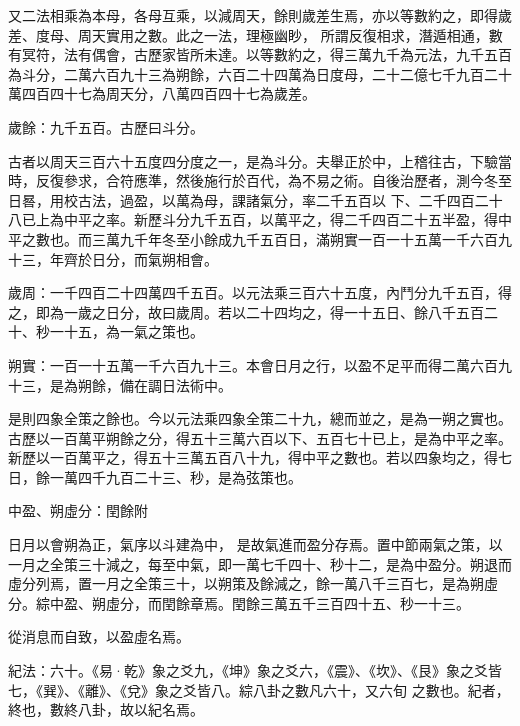 \begin{pinyinscope}
 又二法相乘為本母，各母互乘，以減周天，餘則歲差生焉，亦以等數約之，即得歲差、度母、周天實用之數。此之一法，理極幽眇，
 所謂反復相求，潛遁相通，數有冥符，法有偶會，古歷家皆所未達。以等數約之，得三萬九千為元法，九千五百為斗分，二萬六百九十三為朔餘，六百二十四萬為日度母，二十二億七千九百二十萬四百四十七為周天分，八萬四百四十七為歲差。



 歲餘：九千五百。古歷曰斗分。



 古者以周天三百六十五度四分度之一，是為斗分。夫舉正於中，上稽往古，下驗當時，反復參求，合符應準，然後施行於百代，為不易之術。自後治歷者，測今冬至日晷，用校古法，過盈，以萬為母，課諸氣分，率二千五百以
 下、二千四百二十八已上為中平之率。新歷斗分九千五百，以萬平之，得二千四百二十五半盈，得中平之數也。而三萬九千年冬至小餘成九千五百日，滿朔實一百一十五萬一千六百九十三，年齊於日分，而氣朔相會。



 歲周：一千四百二十四萬四千五百。以元法乘三百六十五度，內鬥分九千五百，得之，即為一歲之日分，故曰歲周。若以二十四均之，得一十五日、餘八千五百二十、秒一十五，為一氣之策也。



 朔實：一百一十五萬一千六百九十三。本會日月之行，以盈不足平而得二萬六百九十三，是為朔餘，備在調日法術中。



 是則四象全策之餘也。今以元法乘四象全策二十九，總而並之，是為一朔之實也。古歷以一百萬平朔餘之分，得五十三萬六百以下、五百七十已上，是為中平之率。新歷以一百萬平之，得五十三萬五百八十九，得中平之數也。若以四象均之，得七日，餘一萬四千九百二十三、秒，是為弦策也。



 中盈、朔虛分：閏餘附



 日月以會朔為正，氣序以斗建為中，
 是故氣進而盈分存焉。置中節兩氣之策，以一月之全策三十減之，每至中氣，即一萬七千四十、秒十二，是為中盈分。朔退而虛分列焉，置一月之全策三十，以朔策及餘減之，餘一萬八千三百七，是為朔虛分。綜中盈、朔虛分，而閏餘章焉。閏餘三萬五千三百四十五、秒一十三。



 從消息而自致，以盈虛名焉。



 紀法：六十。《易·乾》象之爻九，《坤》象之爻六，《震》、《坎》、《艮》象之爻皆七，《巽》、《離》、《兌》象之爻皆八。綜八卦之數凡六十，又六旬
 之數也。紀者，終也，數終八卦，故以紀名焉。




\end{pinyinscope}

